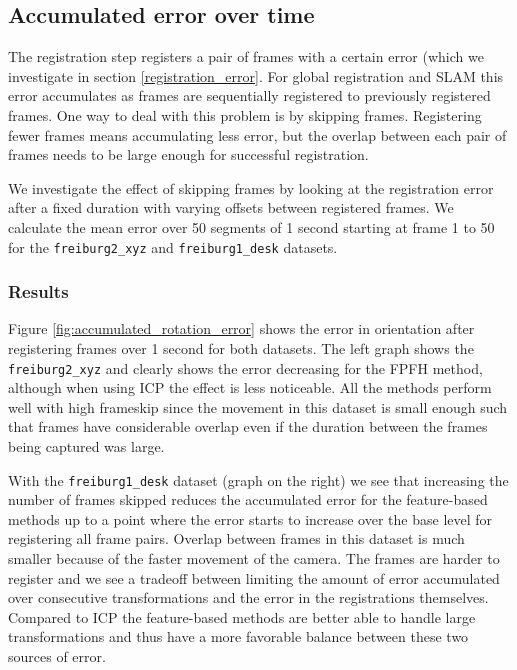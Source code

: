 \documentclass[a4paper]{article}
\begin{document}
\subsection{Accumulated error over time}
\label{accumulated_error}

The registration step registers a pair of frames with a certain error (which we investigate in section \ref{registration_error}. For global registration and \ac{SLAM} this error accumulates as frames are sequentially registered to previously registered frames. One way to deal with this problem is by skipping frames. Registering fewer frames means accumulating less error, but the overlap between each pair of frames needs to be large enough for successful registration. 

We investigate the effect of skipping frames by looking at the registration error after a fixed duration with varying offsets between registered frames. We calculate the mean error over 50 segments of 1 second starting at frame 1 to 50 for the \texttt{freiburg2\_xyz} and \texttt{freiburg1\_desk} datasets.

\subsubsection{Results}

Figure \ref{fig:accumulated_rotation_error} shows the error in orientation after registering frames over 1 second for both datasets. The left graph shows the \texttt{freiburg2\_xyz} and clearly shows the error decreasing for the \ac{FPFH} method, although when using \ac{ICP} the effect is less noticeable. All the methods perform well with high frameskip since the movement in this dataset is small enough such that frames have considerable overlap even if the duration between the frames being captured was large.

With the \texttt{freiburg1\_desk} dataset (graph on the right) we see that increasing the number of frames skipped reduces the accumulated error for the feature-based methods up to a point where the error starts to increase over the base level for registering all frame pairs. Overlap between frames in this dataset is much smaller because of the faster movement of the camera. The frames are harder to register and we see a tradeoff between limiting the amount of error accumulated over consecutive transformations and the error in the registrations themselves. Compared to \ac{ICP} the feature-based methods are better able to handle large transformations and thus have a more favorable balance between these two sources of error.
\end{document}
